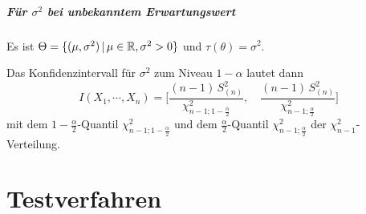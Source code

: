 			\paragraph{Für \(\sigma^2\) bei unbekanntem Erwartungswert}
				Es ist \( \Theta = \{ (\mu, \sigma^2) \,\vert\, \mu \in \mathbb{R}, \sigma^2 > 0 \} \) und \( \tau(\theta) = \sigma^2 \).

				Das Konfidenzintervall für \(\sigma^2\) zum Niveau \( 1 - \alpha \) lautet dann
				\begin{equation*}
					I(X_1, \cdots, X_n) = \Bigg[ \frac{(n - 1) \, S_{(n)}^2}{\chi_{n - 1; 1 - \frac{\alpha}{2}}^2}, \quad \frac{(n - 1) \, S_{(n)}^2}{\chi_{n - 1; \frac{\alpha}{2}}^2} \Bigg]
				\end{equation*}
				mit dem \( 1-\frac{\alpha}{2} \)-Quantil \( \chi_{n-1; 1 - \frac{\alpha}{2}}^2 \) und dem \( \frac{\alpha}{2} \)-Quantil \( \chi_{n-1; \frac{\alpha}{2}}^2 \) der \( \chi_{n-1}^2 \)-Verteilung.

\chapter{Testverfahren}

